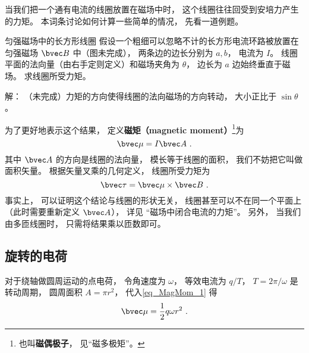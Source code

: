 
\begin{issues}
\issueTODO
\end{issues}


当我们把一个通有电流的线圈放置在磁场中时， 这个线圈往往回受到安培力产生的力矩。 本词条讨论如何计算一些简单的情况， 先看一道例题。

\begin{example}{匀强磁场中的长方形线圈}
假设一个粗细可以忽略不计的长方形电流环路被放置在匀强磁场 $\bvec B$ 中（图未完成）， 两条边的边长分别为 $a, b$， 电流为 $I$。 线圈平面的法向量（由右手定则定义）和磁场夹角为 $\theta$， 边长为 $a$ 边始终垂直于磁场。 求线圈所受力矩。

解： （未完成）力矩的方向使得线圈的法向磁场的方向转动， 大小正比于 $\sin\theta$。
\end{example}

为了更好地表示这个结果， 定义\textbf{磁矩（magnetic moment）}\footnote{也叫\textbf{磁偶极子}， 见“磁多极矩”。}为
\begin{equation}\label{eq_MagMom_1}
\bvec \mu = I \bvec A~.
\end{equation}
其中 $\bvec A$ 的方向是线圈的法向量， 模长等于线圈的面积， 我们不妨把它叫做面积矢量。 根据矢量叉乘的几何定义， 线圈所受力矩为
\begin{equation}\label{eq_MagMom_2}
\bvec \tau = \bvec \mu \times \bvec B~.
\end{equation}
事实上， 可以证明这个结论与线圈的形状无关， 线圈甚至可以不在同一个平面上（此时需要重新定义 $\bvec A$）， 详见 “磁场中闭合电流的力矩”。 另外， 当我们由多匝线圈时， 只需将结果乘以匝数即可。

\subsection{旋转的电荷}
对于绕轴做圆周运动的点电荷， 令角速度为 $\omega$， 等效电流为 $q/T$， $T = 2\pi/\omega$ 是转动周期， 圆周面积 $A = \pi r^2$， 代入\autoref{eq_MagMom_1} 得
\begin{equation}
\bvec \mu = \frac{1}{2} q\omega r^2~.
\end{equation}

